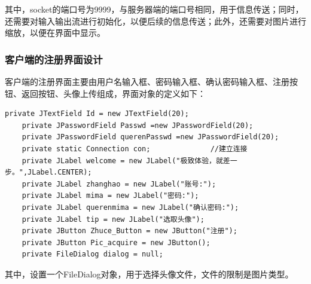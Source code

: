 \documentclass[UTF8,12pt]{article}
\begin{document}
其中，socket的端口号为9999，与服务器端的端口号相同，用于信息传送；同时，还需要对输入输出流进行初始化，以便后续的信息传送；此外，还需要对图片进行缩放，以便在界面中显示。

\subsubsection{客户端的注册界面设计}
客户端的注册界面主要由用户名输入框、密码输入框、确认密码输入框、注册按钮、返回按钮、头像上传组成，界面对象的定义如下：

\begin{lstlisting}[title=注册界面对象的定义,frame=shadowbox]
    private JTextField Id = new JTextField(20);
    private JPasswordField Passwd =new JPasswordField(20);
    private JPasswordField querenPasswd =new JPasswordField(20);
    private static Connection con;              //建立连接
    private JLabel welcome = new JLabel("极致体验，就差一步。",JLabel.CENTER);
    private JLabel zhanghao = new JLabel("账号:");
    private JLabel mima = new JLabel("密码:");
    private JLabel querenmima = new JLabel("确认密码:");
    private JLabel tip = new JLabel("选取头像");
    private JButton Zhuce_Button = new JButton("注册");
    private JButton Pic_acquire = new JButton();
    private FileDialog dialog = null;
\end{lstlisting}

其中，设置一个FileDialog对象，用于选择头像文件，文件的限制是图片类型。
\end{document}
